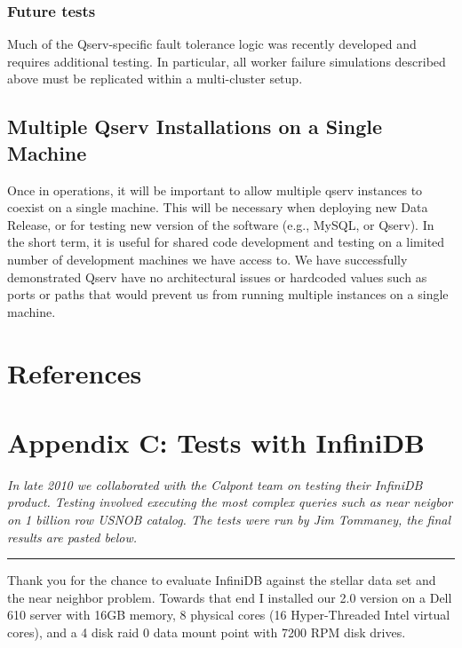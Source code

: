 \documentclass[DM,lsstdraft,toc]{lsstdoc}
\begin{document}
\subsubsection{Future tests}\label{future-tests}

Much of the Qserv-specific fault tolerance logic was recently developed
and requires additional testing. In particular, all worker failure
simulations described above must be replicated within a multi-cluster
setup.

\subsection{Multiple Qserv Installations on a Single
Machine}\label{multiple-qserv-installations-on-a-single-machine}

Once in operations, it will be important to allow multiple qserv
instances to coexist on a single machine. This will be necessary when
deploying new Data Release, or for testing new version of the software
(e.g., MySQL, or Qserv). In the short term, it is useful for shared code
development and testing on a limited number of development machines we
have access to. We have successfully demonstrated Qserv have no
architectural issues or hardcoded values such as ports or paths that
would prevent us from running multiple instances on a single machine.

\section{References}\label{references}
\renewcommand{\refname}{}


\section{Appendix C: Tests with
InfiniDB}\label{appendix-c-tests-with-infinidb}

\emph{In late 2010 we collaborated with the Calpont team on testing
their InfiniDB product. Testing involved executing the most complex
queries such as near neigbor on 1 billion row USNOB catalog. The tests
were run by Jim Tommaney, the final results are pasted below.}

\begin{center}\rule{0.5\linewidth}{\linethickness}\end{center}

Thank you for the chance to evaluate InfiniDB against the stellar data
set and the near neighbor problem. Towards that end I installed our 2.0
version on a Dell 610 server with 16GB memory, 8 physical cores (16
Hyper-Threaded Intel virtual cores), and a 4 disk raid 0 data mount
point with 7200 RPM disk drives.
\end{document}

